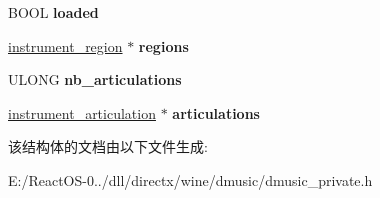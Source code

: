 \begin{DoxyCompactItemize}
\item 
\mbox{\label{struct_i_direct_music_instrument_impl_af5f810db2f2901c213817d925177d7a9}} 
B\+O\+OL {\bfseries loaded}
\item 
\mbox{\label{struct_i_direct_music_instrument_impl_a85f11396cba437da4f836baf2a8bd8fc}} 
\hyperlink{structinstrument__region}{instrument\+\_\+region} $\ast$ {\bfseries regions}
\item 
\mbox{\label{struct_i_direct_music_instrument_impl_a01c28629f5df4ab5bba7f780a53a02fd}} 
U\+L\+O\+NG {\bfseries nb\+\_\+articulations}
\item 
\mbox{\label{struct_i_direct_music_instrument_impl_a709804085e64d9f51e2b2858c4b9cec0}} 
\hyperlink{structinstrument__articulation}{instrument\+\_\+articulation} $\ast$ {\bfseries articulations}
\end{DoxyCompactItemize}


该结构体的文档由以下文件生成\+:\begin{DoxyCompactItemize}
\item 
E\+:/\+React\+O\+S-\/0../dll/directx/wine/dmusic/dmusic\+\_\+private.\+h\end{DoxyCompactItemize}
